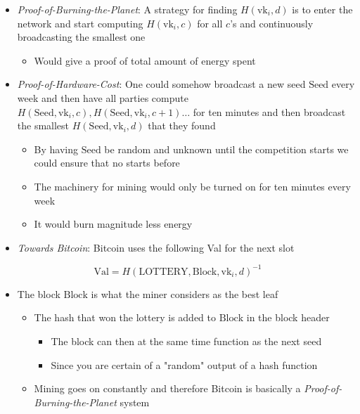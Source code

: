 \documentclass[11pt]{article}
\begin{document}
\begin{itemize}
\item \emph{Proof-of-Burning-the-Planet}: A strategy for finding \(H(\text{vk}_i, d)\) is to enter the network and start computing \(H(\text{vk}_i,c)\) for all \(c\)'s and continuously broadcasting the smallest one
\begin{itemize}
\item Would give a proof of total amount of energy spent
\end{itemize}

\item \emph{Proof-of-Hardware-Cost}: One could somehow broadcast a new seed \(\text{Seed}\) every week and then have all parties compute \(H(\text{Seed}, \text{vk}_i, c), H(\text{Seed}, \text{vk}_i, c+1) \dots\) for ten minutes and then broadcast the smallest \(H(\text{Seed},\text{vk}_i,d)\) that they found
\begin{itemize}
\item By having \(\text{Seed}\) be random and unknown until the competition starts we could ensure that no starts before
\item The machinery for mining would only be turned on for ten minutes every week
\item It would burn magnitude less energy
\end{itemize}

\item \emph{Towards Bitcoin}: Bitcoin uses the following Val for the next slot
\end{itemize}
\begin{equation}
  \text{Val} = H(\text{LOTTERY}, \text{Block}, \text{vk}_i, d)^{-1}
\end{equation}
\begin{itemize}
\item The block \(\text{Block}\) is what the miner considers as the best leaf
\begin{itemize}
\item The hash that won the lottery is added to \(\text{Block}\) in the block header
\begin{itemize}
\item The block can then at the same time function as the next seed
\item Since you are certain of a "random" output of a hash function
\end{itemize}
\item Mining goes on constantly and therefore Bitcoin is basically a \emph{Proof-of-Burning-the-Planet} system
\end{itemize}
\end{itemize}
\end{document}
